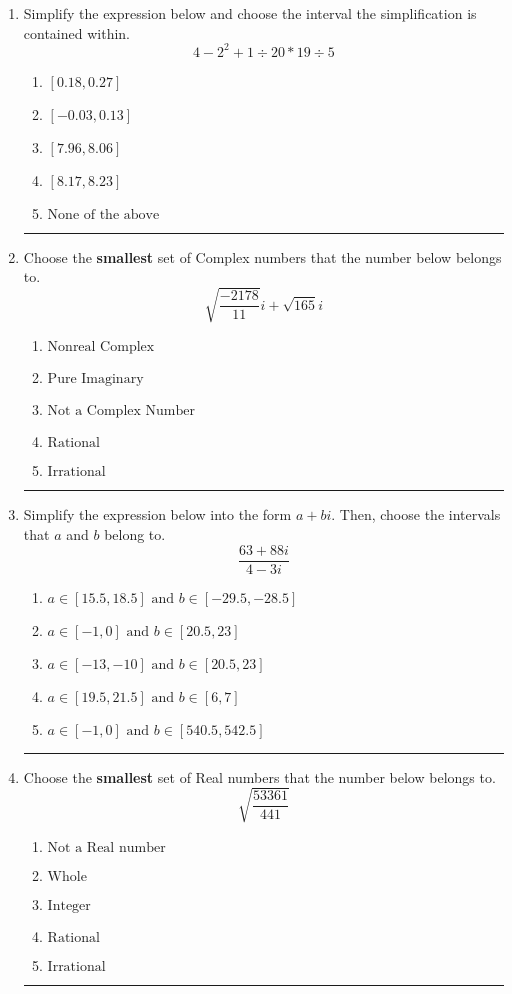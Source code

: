 \documentclass[14pt]{extbook}
\newcommand{\litem}[1]{\item#1\hspace*{-1cm}\rule{\textwidth}{0.4pt}}
\begin{document}
\begin{enumerate}
\litem{
Simplify the expression below and choose the interval the simplification is contained within.\[ 4 - 2^2 + 1 \div 20 * 19 \div 5 \]\begin{enumerate}[label=\Alph*.]
\item \( [0.18, 0.27] \)
\item \( [-0.03, 0.13] \)
\item \( [7.96, 8.06] \)
\item \( [8.17, 8.23] \)
\item \( \text{None of the above} \)

\end{enumerate} }
\litem{
Choose the \textbf{smallest} set of Complex numbers that the number below belongs to.\[ \sqrt{\frac{-2178}{11}} i+\sqrt{165}i \]\begin{enumerate}[label=\Alph*.]
\item \( \text{Nonreal Complex} \)
\item \( \text{Pure Imaginary} \)
\item \( \text{Not a Complex Number} \)
\item \( \text{Rational} \)
\item \( \text{Irrational} \)

\end{enumerate} }
\litem{
Simplify the expression below into the form $a+bi$. Then, choose the intervals that $a$ and $b$ belong to.\[ \frac{63 + 88 i}{4 - 3 i} \]\begin{enumerate}[label=\Alph*.]
\item \( a \in [15.5, 18.5] \text{ and } b \in [-29.5, -28.5] \)
\item \( a \in [-1, 0] \text{ and } b \in [20.5, 23] \)
\item \( a \in [-13, -10] \text{ and } b \in [20.5, 23] \)
\item \( a \in [19.5, 21.5] \text{ and } b \in [6, 7] \)
\item \( a \in [-1, 0] \text{ and } b \in [540.5, 542.5] \)

\end{enumerate} }
\litem{
Choose the \textbf{smallest} set of Real numbers that the number below belongs to.\[ \sqrt{\frac{53361}{441}} \]\begin{enumerate}[label=\Alph*.]
\item \( \text{Not a Real number} \)
\item \( \text{Whole} \)
\item \( \text{Integer} \)
\item \( \text{Rational} \)
\item \( \text{Irrational} \)


\end{enumerate}}
\end{enumerate}
\end{document}
